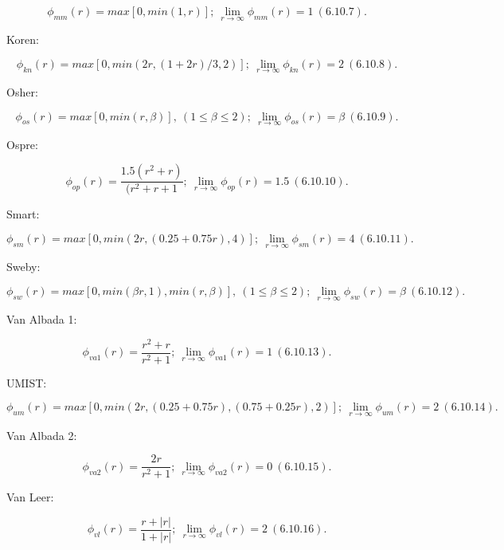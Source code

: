 \documentclass{article}
\begin{document}
$$ \phi_{mm}(r) = max[0, min(1,r)]; \: \lim\limits_{r\to \infty}\phi_{mm}(r) = 1  \: (6.10.7). $$

Koren:

$$\phi_{kn}(r) = max[0, min(2r,(1 + 2r)/3,2)]; \: \lim\limits_{r\to \infty}\phi_{kn}(r) = 2 \: (6.10.8). $$

Osher:

$$\phi_{os}(r) = max[0, min(r, \beta)], \: (1\leq\beta\leq2); \: \lim\limits_{r\to \infty}\phi_{os}(r) = \beta \: (6.10.9). $$

Ospre:

$$\phi_{op}(r) = \frac{1.5(r^2 + r)}{(r^2 + r + 1}; \: \lim\limits_{r\to \infty}\phi_{op}(r) = 1.5 \: (6.10.10). $$

Smart:

$$\phi_{sm}(r) = max[0, min(2r,(0.25+0.75r),4)]; \: \lim\limits_{r\to \infty}\phi_{sm}(r) = 4 \: (6.10.11). $$

Sweby:

$$\phi_{sw}(r) = max[0, min({\beta}r,1), min(r, \beta)], \: (1\leq\beta\leq2); \: \lim\limits_{r\to \infty}\phi_{sw}(r) = \beta \: (6.10.12). $$

Van Albada 1:

$$\phi_{va1}(r) = \frac{r^2 + r}{r^2 + 1}; \: \lim\limits_{r\to \infty}\phi_{va1}(r) = 1 \: (6.10.13). $$

UMIST:

$$\phi_{um}(r) = max[0, min(2r,(0.25 + 0.75r),(0.75+0.25r),2)]; \: \lim\limits_{r\to \infty}\phi_{um}(r) = 2 \: (6.10.14). $$

Van Albada 2:

$$\phi_{va2}(r) = \frac{2r}{r^2 + 1}; \: \lim\limits_{r\to \infty}\phi_{va2}(r) = 0 \: (6.10.15). $$

Van Leer:

$$\phi_{vl}(r) = \frac{r + |r|}{1 + |r|}; \: \lim\limits_{r\to \infty}\phi_{vl}(r) = 2 \: (6.10.16). $$
\end{document}
